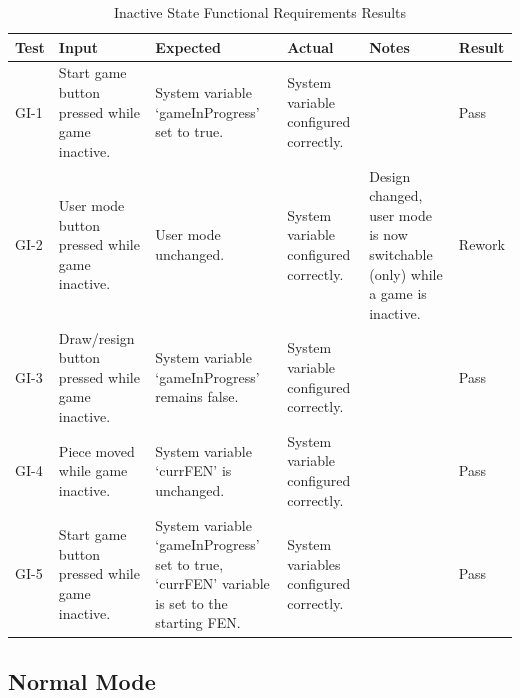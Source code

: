 \documentclass[12pt, titlepage]{article}
\begin{document}
\begin{table}[H]
    \centering
        \setlength{\leftmargini}{0cm}
        \begin{tabular}{| >{\centering\arraybackslash}m{1cm} | 
            >{\centering\arraybackslash}m{2.5cm} | 
            >{\centering\arraybackslash}m{4cm} | 
            >{\centering\arraybackslash}m{3cm} |
            >{\centering\arraybackslash}m{3cm} |
            >{\centering\arraybackslash}m{1.5cm} |}
        \hline
        \rowcolor[gray]{0.9}
        Test & Input & Expected & Actual & Notes & Result\\
        \hline
        GI-1 & Start game button pressed while game inactive. & System variable `gameInProgress' set to true. & System variable configured correctly. &  & Pass \\
        \hline
        GI-2 & User mode button pressed while game inactive. & User mode unchanged. & System variable configured correctly. & Design changed, user mode is now switchable (only) while a game is inactive. & Rework \\
        \hline
        GI-3 & Draw/resign button pressed while game inactive. & System variable `gameInProgress' remains false. & System variable configured correctly. &  & Pass \\
        \hline
        GI-4 & Piece moved while game inactive. & System variable `currFEN' is unchanged. & System variable configured correctly. &  & Pass \\
        \hline
        GI-5 & Start game button pressed while game inactive. & System variable `gameInProgress' set to true, `currFEN' variable is set to the starting FEN. &  System variables configured correctly. &  & Pass \\
        \hline
        \end{tabular}
    \caption{Inactive State Functional Requirements Results}
\end{table}

\subsection{Normal Mode}
\end{document}
